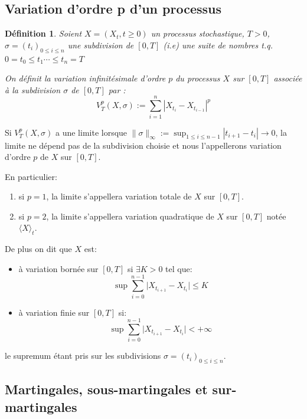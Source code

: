 \documentclass[A4paper,12pt]{report}
\newtheorem{definition}{D\'efinition}[chapter]
\begin{document}
\subsection{Variation d'ordre p d'un processus}
\begin{definition}
Soient $X=(X_t, t\geq 0)$ un processus stochastique, $T>0$, $\sigma=\left(t_{i}\right)_{0 \leq i \leq n}$ une subdivision  de $[0, T]$ (i.e) une suite de nombres t.q. $0=t_{0} \leq t_{1} \cdots \leq t_{n}=T$

On définit la variation infinitésimale d'ordre $p$ du processus $X$ sur $[0, T]$ associée à la subdivision $\sigma$ de $[0, T]$ par :
$$
V_{T}^{p}(X, \sigma):=\sum_{i=1}^{n}\left|X_{t_{i}}-X_{t_{i-1}}\right|^{p} 
$$
\end{definition}

Si $V_{T}^{p}(X, \sigma)$ a une limite lorsque $\|\sigma\|_{\infty}:=\sup _{1 \leq i \leq n-1}\left|t_{i+1}-t_{i}\right| \rightarrow 0$, la limite ne dépend pas de la subdivision choisie et nous l'appellerons variation d'ordre $p$ de $X$ sur $[0, T]$.

En particulier:
\begin{enumerate}
\item si $p=1$, la limite s'appellera variation totale de $X$ sur $[0, T]$.

\item si $p=2$, la limite s'appellera variation quadratique de $X$ sur $[0, T]$ notée $\langle X\rangle_{t}$.
\end{enumerate}

De plus on dit que $X$ est:
\begin{itemize}
\item à variation bornée sur $[0,T]$ si $\exists K>0$ tel que: $$\sup \sum_{i=0}^{n-1} \lvert X_{t_{i+1}} - X_{t_i} \rvert \leq K $$
\item à variation finie sur $[0,T]$ si: $$\sup \sum_{i=0}^{n-1} \lvert X_{t_{i+1}} - X_{t_i} \rvert < + \infty$$
\end{itemize}
le supremum étant pris sur les subdivisions $\sigma=\left(t_{i}\right)_{0 \leq i \leq n}$. 
\subsection{Martingales, sous-martingales et sur-martingales}
\end{document}
